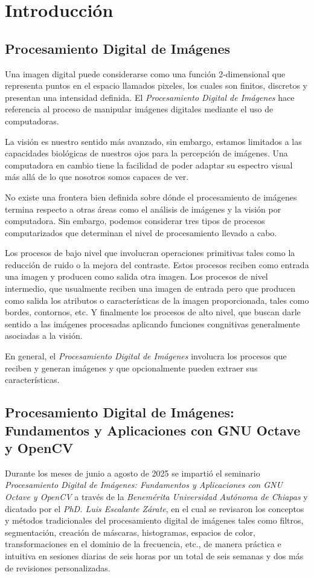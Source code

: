 \chapter{Introducción}

\section{Procesamiento Digital de Imágenes}
Una imagen digital puede considerarse como una función 2-dimensional que representa puntos en el espacio llamados pixeles, los cuales son finitos, discretos y presentan una intensidad definida. El \textit{Procesamiento Digital de Imágenes} hace referencia al proceso de manipular imágenes digitales mediante el uso de computadoras.

La visión es nuestro sentido más avanzado, sin embargo, estamos limitados a las capacidades biológicas de nuestros ojos para la percepción de imágenes. Una computadora en cambio tiene la facilidad de poder adaptar su espectro visual más allá de lo que nosotros somos capaces de ver.

No existe una frontera bien definida sobre dónde el procesamiento de imágenes termina respecto a otras áreas como el análisis de imágenes y la visión por computadora. Sin embargo, podemos considerar tres tipos de procesos computarizados que determinan el nivel de procesamiento llevado a cabo.

Los procesos de bajo nivel que involucran operaciones primitivas tales como la reducción de ruido o la mejora del contraste. Estos procesos reciben como entrada una imagen y producen como salida otra imagen. Los procesos de nivel intermedio, que usualmente reciben una imagen de entrada pero que producen como salida los atributos o características de la imagen proporcionada, tales como bordes, contornos, etc. Y finalmente los procesos de alto nivel, que buscan darle sentido a las imágenes procesadas aplicando funciones congnitivas generalmente asociadas a la visión.

En general, el \textit{Procesamiento Digital de Imágenes} involucra los procesos que reciben y generan imágenes y que opcionalmente pueden extraer sus características. \cite{gonzalez2008digital}

\section{Procesamiento Digital de Imágenes: Fundamentos y Aplicaciones con GNU Octave y OpenCV}
Durante los meses de junio a agosto de 2025 se impartió el seminario \textit{Procesamiento Digital de Imágenes: Fundamentos y Aplicaciones con GNU Octave y OpenCV} a través de la \textit{Benemérita Universidad Autónoma de Chiapas} y dicatado por el \textit{PhD. Luis Escalante Zárate}, en el cual se revisaron los conceptos y métodos tradicionales del procesamiento digital de imágenes tales como filtros, segmentación, creación de máscaras, histogramas, espacios de color, transformaciones en el dominio de la frecuencia, etc., de manera práctica e intuitiva en sesiones diarias de seis horas por un total de seis semanas y dos más de revisiones personalizadas.

